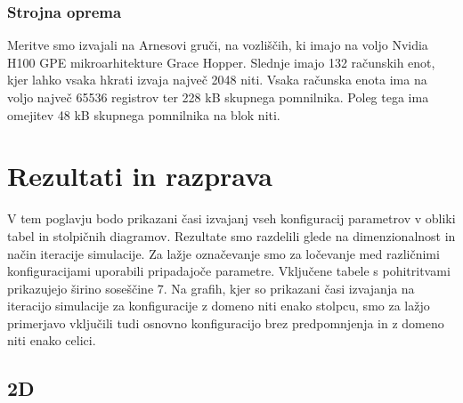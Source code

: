 \documentclass[a4paper, 12pt, openright]{book}
\begin{document}
\subsection{Strojna oprema}

Meritve smo izvajali na Arnesovi gruči, na vozliščih, ki imajo na voljo Nvidia H100 GPE mikroarhitekture Grace Hopper.
Slednje imajo 132 računskih enot, kjer lahko vsaka hkrati izvaja največ 2048 niti.
Vsaka računska enota ima na voljo največ 65536 registrov ter 228 kB skupnega pomnilnika.
Poleg tega ima omejitev 48 kB skupnega pomnilnika na blok niti.





\chapter{Rezultati in razprava}
\label{rezultati}

V tem poglavju bodo prikazani časi izvajanj vseh konfiguracij parametrov v obliki tabel in stolpičnih diagramov.
Rezultate smo razdelili glede na dimenzionalnost in način iteracije simulacije.
Za lažje označevanje smo za ločevanje med različnimi konfiguracijami uporabili pripadajoče parametre.
Vključene tabele s pohitritvami prikazujejo širino soseščine 7.
Na grafih, kjer so prikazani časi izvajanja na iteracijo simulacije za konfiguracije z domeno niti enako stolpcu, smo za lažjo primerjavo vključili tudi osnovno konfiguracijo brez predpomnjenja in z domeno niti enako celici.

\section{2D}
\end{document}
